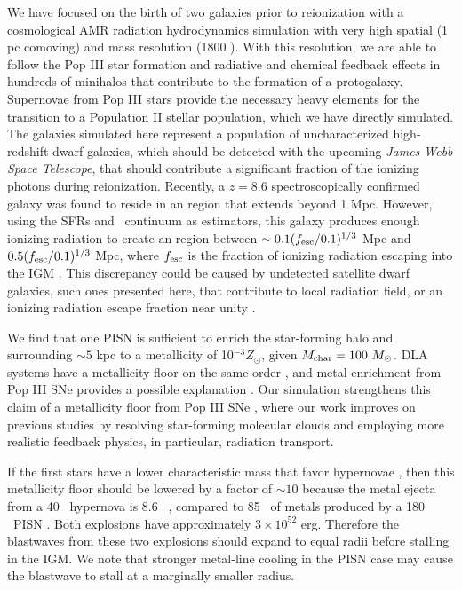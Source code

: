 \documentclass[12pt,preprint]{aastex}
\begin{document}
We have focused on the birth of two galaxies prior to reionization
with a cosmological AMR radiation hydrodynamics simulation with very
high spatial (1 pc comoving) and mass resolution (1800 \Ms).  With
this resolution, we are able to follow the Pop III star formation and
radiative and chemical feedback effects in hundreds of minihalos that
contribute to the formation of a protogalaxy.  Supernovae from Pop III
stars provide the necessary heavy elements for the transition to a
Population II stellar population, which we have directly simulated.
The galaxies simulated here represent a population of uncharacterized
high-redshift dwarf galaxies, which should be detected with the
upcoming \textit{James Webb Space Telescope}, that should contribute a
significant fraction of the ionizing photons during reionization.
Recently, a $z=8.6$ spectroscopically confirmed galaxy was found to
reside in an  region that extends beyond 1 Mpc.  However,
using the SFRs and \lya~continuum as estimators, this galaxy produces
enough ionizing radiation to create an  region between $\sim
0.1(f_{\rm esc}/0.1)^{1/3}$ Mpc and $0.5(f_{\rm esc}/0.1)^{1/3}$ Mpc,
where $f_{\rm esc}$ is the fraction of ionizing radiation escaping
into the IGM \citep{Lehnert10_z8.6}.  This discrepancy could be caused
by undetected satellite dwarf galaxies, such ones presented here, that
contribute to local radiation field, or an ionizing radiation escape
fraction near unity \citep{Wise09, Razoumov10, Paardekooper11,
  Yajima11}.

We find that one PISN is sufficient to enrich the star-forming halo
and surrounding $\sim 5$ kpc to a metallicity of 10$^{-3} Z_\odot$,
given $M_{\rm char} = 100~\Ms$.  DLA systems have a metallicity floor
on the same order \citep{Wolfe05_Review, Penprase10}, and metal
enrichment from Pop III SNe provides a possible explanation
\citep{Kobayashi11}.  Our simulation strengthens this claim of a
metallicity floor from Pop III SNe \citep[see also][]{Tornatore07,
  Karlsson08, Maio11_Enrich}, where our work improves on previous
studies by resolving star-forming molecular clouds and employing more
realistic feedback physics, in particular, radiation transport.

If the first stars have a lower characteristic mass that favor
hypernovae \citep{Tumlinson07_IMF}, then this metallicity floor should
be lowered by a factor of $\sim 10$ because the metal ejecta from a 40
\Ms~hypernova is 8.6 \Ms~\citep{Nomoto06}, compared to 85 \Ms~of
metals produced by a 180 \Ms~PISN \citep{Heger02}.  Both explosions
have approximately $3 \times 10^{52}$ erg.  Therefore the blastwaves
from these two explosions should expand to equal radii before stalling
in the IGM.  We note that stronger metal-line cooling in the PISN case
may cause the blastwave to stall at a marginally smaller radius.  
\end{document}
